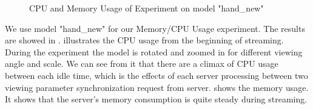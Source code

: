 \begin{figure}
\centering
{}
\label{fig:hand_new_cpu_mem}
\caption{CPU and Memory Usage of Experiment on model "hand\_new"}
\end{figure}
We use model "hand\_new" for our Memory/CPU Usage experiment. The results are showed in .  illustrates the CPU usage from the beginning of streaming. During the experiment the model is rotated and zoomed in for different viewing angle and scale. We can see from it that there are a climax of CPU usage between each idle time, which is the effects of each server processing between two viewing parameter synchronization request from server.  shows the memory usage. It shows that the server's memory consumption is quite steady during streaming. 


